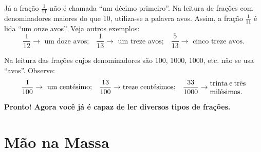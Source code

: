 Já a fração $\frac{1}{11}$ não é chamada ``um décimo primeiro''.
Na leitura de frações com denominadores maiores do que 10, utiliza-se a palavra avos.
Assim, a fração $\frac{1}{11}$ é lida ``um onze avos''.
Veja outros exemplos:  
$$\frac{1}{12}\rightarrow \text{  um doze avos;}\quad \frac{1}{13}\rightarrow \text{ um treze avos;} \quad \frac{5}{13}\rightarrow \text{ cinco treze avos.}$$


Na leitura das frações cujos denominadores são 100, 1000, 1000, etc. não se usa ``avos''. Observe: 
$$\frac{1}{100}\rightarrow \text{ um centésimo;}\quad \frac{13}{100} \rightarrow \text{treze centésimos;} \quad
\frac{33}{1000}\rightarrow \parbox{5em}{trinta e três  milésimos.}$$

{\bfseries Pronto! Agora você já é capaz de ler diversos tipos de frações.}

\section{Mão na Massa}

